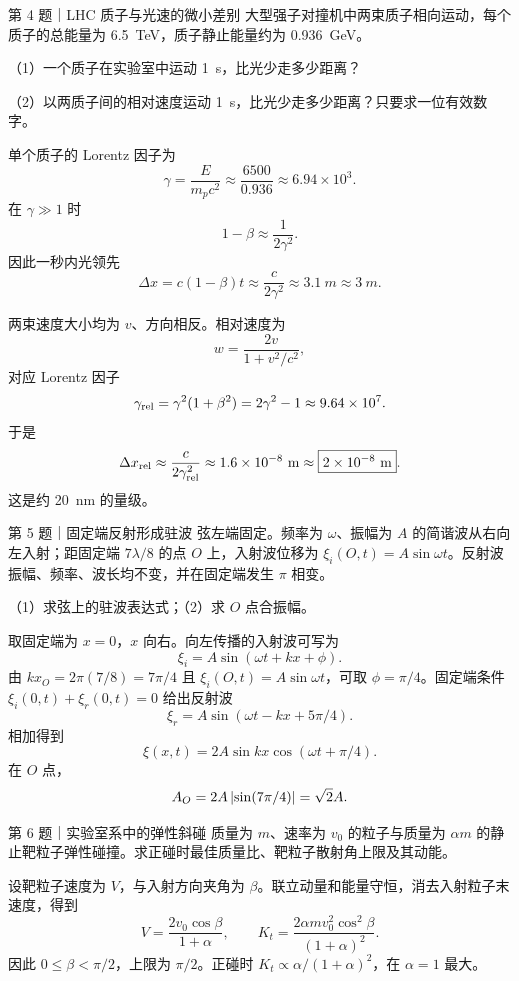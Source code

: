 \begin{problem}{第 4 题｜LHC 质子与光速的微小差别}
大型强子对撞机中两束质子相向运动，每个质子的总能量为 \SI{6.5}{TeV}，质子静止能量约为 \SI{0.936}{GeV}。

（1）一个质子在实验室中运动 \SI{1}{s}，比光少走多少距离？

（2）以两质子间的相对速度运动 \SI{1}{s}，比光少走多少距离？只要求一位有效数字。
\end{problem}
\begin{solution}
单个质子的 Lorentz 因子为
\[
\gamma=\frac{E}{m_pc^2}\approx\frac{6500}{0.936}\approx6.94\times10^3.
\]
在 $\gamma\gg1$ 时
\[
1-\beta\approx\frac1{2\gamma^2}.
\]
因此一秒内光领先
\[
\Delta x=c(1-\beta)t\approx\frac{c}{2\gamma^2}
\approx\SI{3.1}{m}\approx\boxed{\SI{3}{m}}.
\]

两束速度大小均为 $v$、方向相反。相对速度为
\[
w=\frac{2v}{1+v^2/c^2},
\]
对应 Lorentz 因子
\[
\gamma_{\rm rel}=\gamma^2(1+\beta^2)=2\gamma^2-1
\approx9.64\times10^7.
\]
于是
\[
\Delta x_{\rm rel}\approx\frac{c}{2\gamma_{\rm rel}^2}
\approx1.6\times10^{-8}\ \mathrm m
\approx\boxed{2\times10^{-8}\ \mathrm m}.
\]
这是约 \SI{20}{nm} 的量级。
\end{solution}

\begin{problem}{第 5 题｜固定端反射形成驻波}
弦左端固定。频率为 $\omega$、振幅为 $A$ 的简谐波从右向左入射；距固定端 $7\lambda/8$ 的点 $O$ 上，入射波位移为 $\xi_i(O,t)=A\sin\omega t$。反射波振幅、频率、波长均不变，并在固定端发生 $\pi$ 相变。

（1）求弦上的驻波表达式；（2）求 $O$ 点合振幅。
\FigStandingWave
\end{problem}
\begin{solution}
取固定端为 $x=0$，$x$ 向右。向左传播的入射波可写为
\[
\xi_i=A\sin(\omega t+kx+\phi).
\]
由 $kx_O=2\pi(7/8)=7\pi/4$ 且 $\xi_i(O,t)=A\sin\omega t$，可取 $\phi=\pi/4$。固定端条件 $\xi_i(0,t)+\xi_r(0,t)=0$ 给出反射波
\[
\xi_r=A\sin(\omega t-kx+5\pi/4).
\]
相加得到
\[
\boxed{\xi(x,t)=2A\sin kx\cos(\omega t+\pi/4)}.
\]
在 $O$ 点，
\[
A_O=2A\left|\sin(7\pi/4)\right|=\sqrt2A.
\]
\end{solution}

\begin{problem}{第 6 题｜实验室系中的弹性斜碰}
质量为 $m$、速率为 $v_0$ 的粒子与质量为 $\alpha m$ 的静止靶粒子弹性碰撞。求正碰时最佳质量比、靶粒子散射角上限及其动能。
\end{problem}
\begin{solution}
设靶粒子速度为 $V$，与入射方向夹角为 $\beta$。联立动量和能量守恒，消去入射粒子末速度，得到
\[
V=\frac{2v_0\cos\beta}{1+\alpha},
\qquad
K_t=\frac{2\alpha m v_0^2\cos^2\beta}{(1+\alpha)^2}.
\]
因此 $0\le\beta<\pi/2$，上限为 $\pi/2$。正碰时 $K_t\propto\alpha/(1+\alpha)^2$，在 $\alpha=1$ 最大。
\end{solution}

